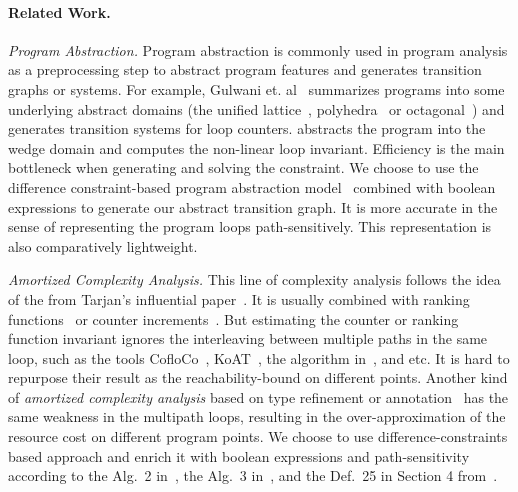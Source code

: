 \paragraph{Related Work.}
\emph{Program Abstraction.}
Program abstraction is commonly used in program analysis as a preprocessing step to abstract program features and generates transition graphs or systems. For example, Gulwani et. al~\cite{GulwaniZ10} summarizes programs into some underlying abstract domains (the unified lattice~\cite{CousotH78}, polyhedra~\cite{CousotC77} or octagonal~\cite{Mine06})
and generates transition systems for loop counters.
\cite{KincaidCBR18} abstracts the program into the wedge domain and computes the non-linear loop invariant.
Efficiency is the main bottleneck when generating and solving the constraint.
We choose to use the difference constraint-based program abstraction model~\cite{SinnZV17,SinnZV14} combined with boolean expressions to generate our abstract transition graph.
It is more accurate in the sense of representing the program loops path-sensitively. This representation is also comparatively lightweight.

\emph{Amortized Complexity Analysis.}
This line of complexity analysis follows the idea of the
from Tarjan's influential paper~\cite{PotechinP17}. It is usually combined with ranking functions~\cite{BradleyMS05,CookSZ13,Zuleger18} or counter increments~\cite{ZulegerGSV11,SinnZV14,SinnZV17,LuCT21,AliasDFG10}.
 But estimating the counter or ranking function invariant ignores the interleaving between multiple paths in the same loop,
such as the tools CofloCo~\cite{Montoya17,Flores-MontoyaH14,Flores-Montoya16}, KoAT~\cite{BrockschmidtEFFG16,BrockschmidtEFFG14,FalkeKS12,FalkeKS11}, the algorithm in~\cite{LuCT21}, and etc.
It is hard to repurpose their result as the reachability-bound on different points.
Another kind of \emph{amortized complexity analysis} based on type refinement or annotation~\cite{CraryW00,JostHLH10,CicekBG0H17,RajaniG0021,CarbonneauxHS15} has the same weakness in the multipath loops, resulting in the over-approximation of the resource cost on different program points.
We choose to use difference-constraints based approach and enrich it with boolean expressions and path-sensitivity according to the Alg.~2 in~\cite{SinnZV14},
the Alg.~3 in~\cite{ZulegerGSV11},
and the Def.~25 in Section 4 from~\cite{SinnZV17}.

